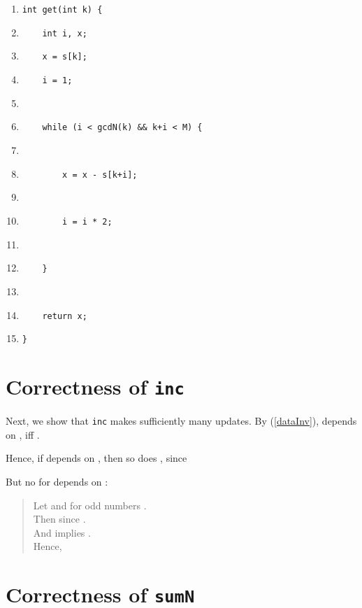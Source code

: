\documentclass{elsartNoFoot}
\newcommand{\1}{\color{red}}
\newcommand{\2}{\color{green}}
\newcommand{\+}[3]{{\renewcommand{\i}{{#1}}{#3},\ldots,\renewcommand{\i}{{#2}}{#3}}}
\begin{document}
\begin{enumerate}
\setlength{\itemsep}{-0.0cm}
\renewcommand{\labelenumi}{\arabic{enumi}.}
 \item{\1\verb|int get(int k) {					|
}\item{\1\verb|    int i, x;					|
}\item{\1\verb|    x = s[k];					|
}\item{\1\verb|    i = 1;					|
}\item{\2\verb|    |
}\item{\1\verb|    while (i < gcdN(k) && k+i < M) {		|
}\item{\2\verb|        |
}\item{\1\verb|        x = x - s[k+i];				|
}\item{\2\verb|        |
}\item{\1\verb|        i = i * 2;				|
}\item{\2\verb|        |
}\item{\1\verb|    }						|
}\item{\2\verb|    |
}\item{\1\verb|    return x;					|
}\item{\1\verb|}						|
}
\end{enumerate}





\section{Correctness of {\tt inc}}
\label{Correctness of inc}

Next, we show that {\tt inc} makes sufficiently many updates.
By (\ref{dataInv}),
 depends on , 
iff
.

Hence, if  depends on ,
then so does , since



But no  for  depends on :
\begin{quote}
Let  and  
for odd numbers .
\\
Then  since .
\\
And 
implies .
\\
Hence,

\end{quote}






\section{Correctness of {\tt sumN}}
\label{Correctness of sumN}
\end{document}
